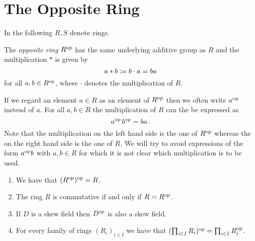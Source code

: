 \section{The Opposite Ring}
\label{appendix: the opposite ring}


\begin{conventions}
  In the following $R, S$ denote rings.
\end{conventions}


\begin{definition}
  The \emph{opposite ring} $R^{\operatorname{op}}$ has the same underlying additive group as $R$ and the multiplication $*$ is given by
  \[
              a * b
    \coloneqq  b \cdot a
    =         ba
  \]
  for all $a, b \in R^{\operatorname{op}}$, where $\cdot$ denotes the multiplication of $R$.
\end{definition}


\begin{notation}
  If we regard an element $a \in R$ as an element of $R^{\operatorname{op}}$ then we often write $a^{{\operatorname{op}}}$ instead of $a$.
  For all $a, b \in R$ the multiplication of $R$ can the be expressed as
  \[
      a^{\operatorname{op}} \, b^{\operatorname{op}}
    = b a \,.
  \]
  Note that the multiplication on the left hand side is the one of $R^{\operatorname{op}}$ whereas the on the right hand side is the one of $R$.
  We will try to avoid expressions of the form $a^{\operatorname{op}} b$ with $a, b \in R$ for which it is not clear which multiplication is to be used.
\end{notation}




\begin{lemma}
  \label{remark: basic properties of op}
  \leavevmode
  \begin{enumerate}
    \item
      We have that $( R^{\operatorname{op}} )^{\operatorname{op}} = R$.
    \item
      The ring $R$ is commutative if and only if $R = R^{\operatorname{op}}$.
    \item
      If $D$ is a skew field then $D^{\operatorname{op}}$ is also a skew field.
    \item
      For every family of rings $(R_i)_{i \in I}$ we have that $( \prod_{i \in I} R_i )^{\operatorname{op}} = \prod_{i \in I} R_i^{\operatorname{op}}$.
  \end{enumerate}
\end{lemma}




